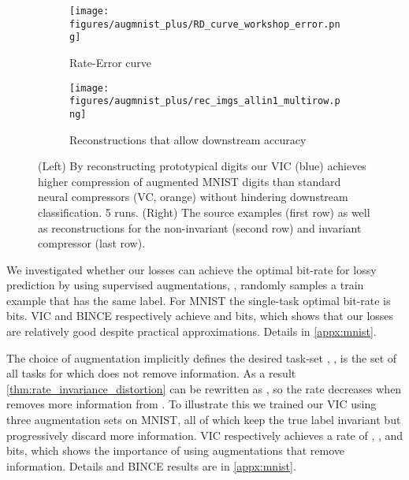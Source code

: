 \documentclass[final]{article}
\begin{document}
\begin{figure}[h]
     \centering
     \begin{subfigure}[h]{0.31\columnwidth}
         \centering
         \texttt{[image: figures/augmnist\_plus/RD\_curve\_workshop\_error.png]}
         \vspace{-1.7em}
         \caption{Rate-Error curve}
         \label{fig:augmnist++_RD}
     \end{subfigure}
     \begin{subfigure}[h]{0.68\columnwidth}
         \centering
         \texttt{[image: figures/augmnist\_plus/rec\_imgs\_allin1\_multirow.png]}
         \vspace{-1.2em}
         \caption{Reconstructions that allow  downstream accuracy}
         \label{fig:augmnist++_RD_rec}
     \end{subfigure}
\caption{
(Left) By reconstructing prototypical digits our VIC (blue) achieves higher compression of augmented MNIST digits than standard neural compressors (VC, orange) without hindering downstream  classification. 5 runs.
(Right) The source examples (first row) as well as reconstructions for the non-invariant (second row) and invariant compressor (last row).
}
\label{fig:augmnist++}
\vspace{-0.5em}
\end{figure} 
We investigated whether our losses can achieve the optimal bit-rate for lossy prediction by using supervised augmentations, \ie,  randomly samples a train example  that has the same label.
For MNIST the single-task optimal bit-rate is  bits. 
 VIC and BINCE respectively achieve  and  bits, which shows that our losses are relatively good despite practical approximations. Details in \cref{appx:mnist}.


The choice of augmentation  implicitly defines the desired task-set , \ie,  is the set of all tasks for which  does not remove information.
As a result \cref{thm:rate_invariance_distortion} can be rewritten as , so the rate decreases when  removes more information from .
To illustrate this we trained our VIC using three augmentation sets on MNIST, all of which keep the true label invariant but progressively discard more  information.
VIC respectively achieves a rate of , , and  bits, which shows the importance of using augmentations that remove  information.
Details and BINCE results are in \cref{appx:mnist}.
\end{document}

